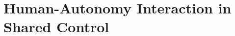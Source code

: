 \documentclass[12pt]{article}
\newcommand{\POINTS}[1]{{\textbf{\color{red}{#1}}}}
\begin{document}


%








\pagebreak

\section{Human-Autonomy Interaction in Shared Control}
\label{sec:HRI_SA}
\end{document}
